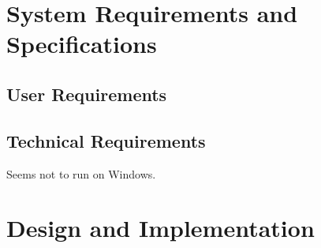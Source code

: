 \documentclass[12pt,a4paper]{article}
\begin{document}
%
%
%
%
%
%
%
%
\newpage
\section{System Requirements and Specifications} \label{section:systemrequirementsandspecifications}




\subsection{User Requirements} \label{subsection:userrequirements}


\subsection{Technical Requirements} \label{subsection:technicalrequirements}

Seems not to run on Windows.





%
%
%
%
%
%
%
%
\newpage
\section{Design and Implementation} \label{section:designandimplementation}
\end{document}
